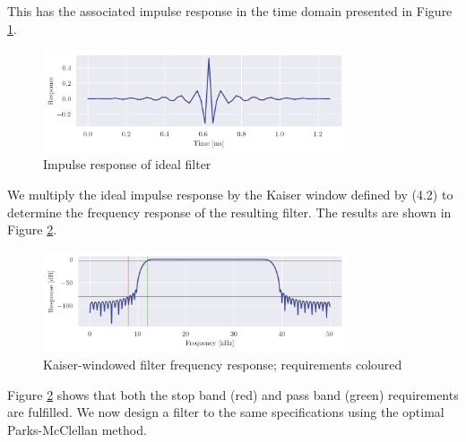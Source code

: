 This has the associated impulse response in the time domain presented in Figure \ref{fig:q4_ideal_impz}.

\begin{figure}[ht]
    \centering
    \includegraphics[width=0.8\textwidth]{images/q4_ideal_impz.png}
    \caption{Impulse response of ideal filter}
    \label{fig:q4_ideal_impz}
\end{figure}

We multiply the ideal impulse response by the Kaiser window defined by (4.2) to determine the frequency response of the resulting filter. The results are shown in Figure \ref{fig:q4_kaiser_freqz}.

\begin{figure}[ht]
    \centering
    \includegraphics[width=0.8\textwidth]{images/q4_kaiser_freqz.png}
    \caption{Kaiser-windowed filter frequency response; requirements coloured}
    \label{fig:q4_kaiser_freqz}
\end{figure}

Figure \ref{fig:q4_kaiser_freqz} shows that both the stop band (red) and pass band (green) requirements are fulfilled. We now design a filter to the same specifications using the optimal Parks-McClellan method.
